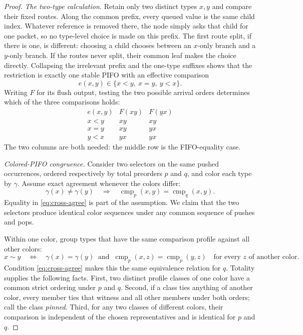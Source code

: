 \documentclass[11pt]{article}
\theoremstyle{definition}
\newcommand{\cmp}{\operatorname{cmp}}
\begin{document}
\begin{proof}
\medskip
\noindent\textit{The two-type calculation.}
Retain only two distinct types \(x,y\) and compare their fixed routes.  Along
the common prefix, every queued value is the same child index.  Whatever
reference is removed there, the node simply asks that child for one packet,
so no type-level choice is made on this prefix.  The first route split, if
there is one, is different: choosing a child chooses between an
\(x\)-only branch and a \(y\)-only branch.  If the routes never split, their
common leaf makes the choice directly.  Collapsing the irrelevant prefix
and the one-type suffixes shows that the restriction is exactly one stable
PIFO with an effective comparison
\[
  e(x,y)\in\{x<y,\ x=y,\ y<x\}.
\]
Writing \(F\) for its flush output, testing the two possible arrival orders
determines which of the three comparisons holds:
\begin{equation}
\begin{array}{c|cc}
e(x,y) & F(xy) & F(yx)\\ \hline
x<y & xy & xy\\
x=y & xy & yx\\
y<x & yx & yx
\end{array}
\tag{2}\label{eq:binary}
\end{equation}
The two columns are both needed: the middle row is the FIFO-equality case.

\medskip
\noindent\textit{Colored-PIFO congruence.}
Consider two selectors on the same pushed occurrences, ordered respectively
by total preorders \(p\) and \(q\), and color each type by \(\gamma\).
Assume exact agreement whenever the colors differ:
\begin{equation}
  \gamma(x)\ne\gamma(y)
  \quad\Longrightarrow\quad
  \cmp_p(x,y)=\cmp_q(x,y).
  \tag{3}\label{eq:cross-agree}
\end{equation}
Equality in \eqref{eq:cross-agree} is part of the assumption.  We claim that
the two selectors produce identical color sequences under any common
sequence of pushes and pops.

Within one color, group types that have the same comparison profile against
all other colors:
\[
 x\sim y
 \quad\Longleftrightarrow\quad
 \gamma(x)=\gamma(y)
 \ \text{ and }\
 \cmp_p(x,z)=\cmp_p(y,z)
 \quad\text{for every }z\text{ of another color}.
\]
Condition \eqref{eq:cross-agree} makes this the same equivalence relation
for \(q\).  Totality supplies the following facts.  First, two distinct
profile classes of one color have a common strict ordering under \(p\) and
\(q\).  Second, if a class ties anything of another color, every member ties
that witness and all other members under both orders; call the class
\emph{pinned}.  Third, for any two classes of different colors, their
comparison is independent of the chosen representatives and is identical
for \(p\) and \(q\).


\end{proof}
\end{document}
